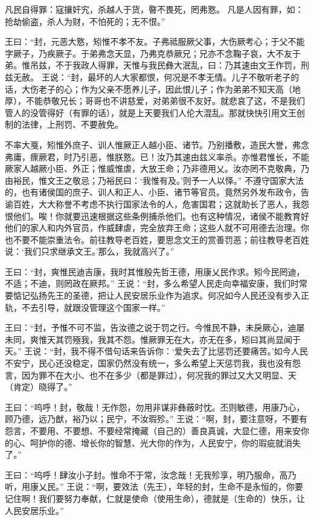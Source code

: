 \documentclass[a4paper,12pt,UTF8,twoside]{ctexbook}
\begin{document}
凡民自得罪：寇攘奸宄，杀越人于货，暋不畏死，罔弗憝。
凡是人因有罪，如：抢劫偷盗，杀人为财，不怕死的；无不恨。”

王曰：“封，元恶大憝，矧惟不孝不友。子弗祗服厥父事，大伤厥考心；于父不能字厥子，乃疾厥子。于弟弗念天显，乃弗克恭厥兄；兄亦不念鞠子哀，大不友于弟。惟吊兹，不于我政人得罪，天惟与我民彝大泯乱，曰：乃其速由文王作罚，刑兹无赦。
王说：“封，最坏的人大家都恨，何况是不孝无情。儿子不敬听老子的话，大伤老子的心；作为父亲不愿养儿子，因此恨儿子；作为弟弟不知天高（地厚），不能恭敬兄长；哥哥也不讲慈爱，对弟弟很不友好。就悲哀了这，不是我们管人的没管得好（有罪的话），就是上天要我们人伦大混乱。那就快快引用文王创制的法律，上刑罚、不要赦免。

不率大戛，矧惟外庶子、训人惟厥正人越小臣、诸节。乃别播敷，造民大誉，弗念弗庸，瘝厥君，时乃引恶，惟朕憝。已！汝乃其速由兹义率杀。亦惟君惟长，不能厥家人越厥小臣、外正；惟威惟虐，大放王命；乃非德用乂。汝亦罔不克敬典，乃由裕民，惟文王之敬忌；乃裕民曰：‘我惟有及。’则予一人以怿。”
不遵守国家大法的，也有诸侯国的庶子、训人和正人、小臣、诸节等官员。竟然另外发布政令，告谕百姓，大大称誉不考虑不执行国家法令的人，危害国君；这就助长了恶人，我怨恨他们。唉！你就要迅速根据这些条例捕杀他们。也有这种情况，诸侯不能教育好他们的家人和内外官员，作威肆虐，完全放弃王命；这些人就不可用德去治理。你也不要不能崇重法令。前往教导老百姓，要思念文王的赏善罚恶；前往教导老百姓说：‘我们只求继承文王。’那么，我就高兴了。”

王曰：“封，爽惟民迪吉康，我时其惟殷先哲王德，用康乂民作求。矧今民罔迪，不适；不迪，则罔政在厥邦。”
王说：“封，多么希望人民走向幸福安康，我们时常要惦记弘扬先王的圣德，把让人民安居乐业作为追求。何况如今人民还没有步入正轨，不去引导，就跟没管理这个国家一样。”

王曰：“封，予惟不可不监，告汝德之说于罚之行。今惟民不静，未戾厥心，迪屡未同，爽惟天其罚殛我，我其不怨。惟厥罪无在大，亦无在多，矧曰其尚显闻于天。”
王说：“封，我不得不借句话来告诉你：‘爱失去了比惩罚还要痛苦。’如今人民不安宁，民心还没稳定，国家仍然没有统一，多么希望上天惩罚我，我也没有怨言，因为罪不在大小、也不在多少（都是罪过），何况我的罪过又大又明显、天（肯定）晓得了。”

王曰：“呜呼！封，敬哉！无作怨，勿用非谋非彝蔽时忱。丕则敏德，用康乃心，顾乃德，远乃猷，裕乃以；民宁，不汝瑕殄。”
王说：“啊，封，要注意呀，不要有怨言，不要用、不要想、不要经常掩藏（自己的）善良真诚，大显仁德，用来安你的心、呵护你的德、增长你的智慧、光大你的作为，人民安宁，你的瑕疵就消失了。”

王曰：“呜呼！肆汝小子封。惟命不于常，汝念哉！无我殄享，明乃服命，高乃听，用康乂民。”
王说：“啊，要效法（先王），年轻的封，生命不是永恒的，你要记住啊！我们要努力奉献，仁就是使命（使用生命），德就是（生命的）快乐，让人民安居乐业。”
\end{document}
